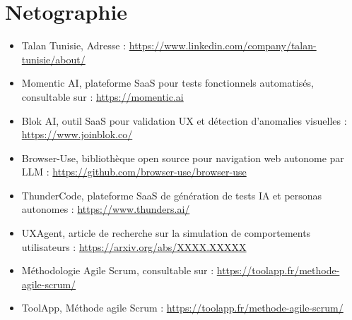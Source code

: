\documentclass[12pt,a4paper]{report}
\begin{document}
\section*{Netographie}


\begin{itemize}
    \item[\hypertarget{refTalanTunisie}{\textbf{[\thecustomref]}}] 
    Talan Tunisie, Adresse : \href{https://www.linkedin.com/company/talan-tunisie/about/}{https://www.linkedin.com/company/talan-tunisie/about/}

\item[\hypertarget{ref\thecustomref}{\textbf{[\thecustomref]}}]
\label{ref:MomenticAI}
Momentic AI, plateforme SaaS pour tests fonctionnels automatisés, consultable sur : 
\href{https://momentic.ai/}{https://momentic.ai}

\item[\hypertarget{ref\thecustomref}{\textbf{[\thecustomref]}}]
\label{ref:BlokAI}
Blok AI, outil SaaS pour validation UX et détection d’anomalies visuelles : 
\href{https://www.joinblok.co/}{https://www.joinblok.co/}

\item[\hypertarget{ref\thecustomref}{\textbf{[\thecustomref]}}]
\label{ref:BrowserUse}
Browser-Use, bibliothèque open source pour navigation web autonome par LLM : 
\href{https://github.com/browser-use/browser-use}{https://github.com/browser-use/browser-use}

\item[\hypertarget{ref\thecustomref}{\textbf{[\thecustomref]}}]
\label{ref:ThunderCode}
ThunderCode, plateforme SaaS de génération de tests IA et personas autonomes : 
\href{https://www.thunders.ai/}{https://www.thunders.ai/}

\item[\hypertarget{ref\thecustomref}{\textbf{[\thecustomref]}}]
\label{ref:UXAgent}
UXAgent, article de recherche sur la simulation de comportements utilisateurs : 
\href{https://arxiv.org/abs/XXXX.XXXXX}{https://arxiv.org/abs/XXXX.XXXXX}

\item[\hypertarget{ref:AgileScrum}{\textbf{[\thecustomref]}}]
\label{ref:AgileScrum}
Méthodologie Agile Scrum, consultable sur : 
\href{https://toolapp.fr/methode-agile-scrum/}{https://toolapp.fr/methode-agile-scrum/}


\item[\hypertarget{ref\thecustomref}{\textbf{[\thecustomref]}}]
\label{ref:Scrum}
ToolApp, Méthode agile Scrum : 
\href{https://toolapp.fr/methode-agile-scrum/}{https://toolapp.fr/methode-agile-scrum/}

\end{itemize}
\end{document}
